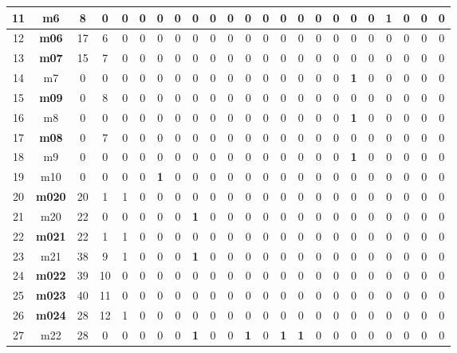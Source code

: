 \documentclass[a4paper,14pt]{extarticle}
\begin{document}
\begin{landscape}
\begin{table}[htbp]
\begin{tabular}{|c||c|c|c|c|c|c|c|c|c|c|c|c|c|c|c|c|c|c|c|c|c|c|}
		11 & m6 & 8 & 0 & 0 & 0 & 0 & 0 & 0 & 0 & 0 & 0 & 0 & 0 & 0 & 0 & 0 & 0 & 0 & \textbf{1} & 0 & 0 & 0 \\ \hline
		12 & \textbf{m06} & 17 & 6 & 0 & 0 & 0 & 0 & 0 & 0 & 0 & 0 & 0 & 0 & 0 & 0 & 0 & 0 & 0 & 0 & 0 & 0 & 0 \\ \hline
		13 & \textbf{m07} & 15 & 7 & 0 & 0 & 0 & 0 & 0 & 0 & 0 & 0 & 0 & 0 & 0 & 0 & 0 & 0 & 0 & 0 & 0 & 0 & 0 \\ \hline
		14 & m7 & 0 & 0 & 0 & 0 & 0 & 0 & 0 & 0 & 0 & 0 & 0 & 0 & 0 & 0 & 0 & \textbf{1} & 0 & 0 & 0 & 0 & 0 \\ \hline
		15 & \textbf{m09} & 0 & 8 & 0 & 0 & 0 & 0 & 0 & 0 & 0 & 0 & 0 & 0 & 0 & 0 & 0 & 0 & 0 & 0 & 0 & 0 & 0 \\ \hline
		16 & m8 & 0 & 0 & 0 & 0 & 0 & 0 & 0 & 0 & 0 & 0 & 0 & 0 & 0 & 0 & 0 & \textbf{1} & 0 & 0 & 0 & 0 & 0 \\ \hline
		17 & \textbf{m08} & 0 & 7 & 0 & 0 & 0 & 0 & 0 & 0 & 0 & 0 & 0 & 0 & 0 & 0 & 0 & 0 & 0 & 0 & 0 & 0 & 0 \\ \hline
		18 & m9 & 0 & 0 & 0 & 0 & 0 & 0 & 0 & 0 & 0 & 0 & 0 & 0 & 0 & 0 & 0 & \textbf{1} & 0 & 0 & 0 & 0 & 0 \\ \hline
		19 & m10 & 0 & 0 & 0 & 0 & \textbf{1} & 0 & 0 & 0 & 0 & 0 & 0 & 0 & 0 & 0 & 0 & 0 & 0 & 0 & 0 & 0 & 0 \\ \hline
		20 & \textbf{m020} & 20 & 1 & 1 & 0 & 0 & 0 & 0 & 0 & 0 & 0 & 0 & 0 & 0 & 0 & 0 & 0 & 0 & 0 & 0 & 0 & 0 \\ \hline
		21 & m20 & 22 & 0 & 0 & 0 & 0 & 0 & \textbf{1} & 0 & 0 & 0 & 0 & 0 & 0 & 0 & 0 & 0 & 0 & 0 & 0 & 0 & 0 \\ \hline
		22 & \textbf{m021} & 22 & 1 & 1 & 0 & 0 & 0 & 0 & 0 & 0 & 0 & 0 & 0 & 0 & 0 & 0 & 0 & 0 & 0 & 0 & 0 & 0 \\ \hline
		23 & m21 & 38 & 9 & 1 & 0 & 0 & 0 & \textbf{1} & 0 & 0 & 0 & 0 & 0 & 0 & 0 & 0 & 0 & 0 & 0 & 0 & 0 & 0 \\ \hline
		24 & \textbf{m022} & 39 & 10 & 0 & 0 & 0 & 0 & 0 & 0 & 0 & 0 & 0 & 0 & 0 & 0 & 0 & 0 & 0 & 0 & 0 & 0 & 0 \\ \hline
		25 & \textbf{m023} & 40 & 11 & 0 & 0 & 0 & 0 & 0 & 0 & 0 & 0 & 0 & 0 & 0 & 0 & 0 & 0 & 0 & 0 & 0 & 0 & 0 \\ \hline
		26 & \textbf{m024} & 28 & 12 & 1 & 0 & 0 & 0 & 0 & 0 & 0 & 0 & 0 & 0 & 0 & 0 & 0 & 0 & 0 & 0 & 0 & 0 & 0 \\ \hline
		27 & m22 & 28 & 0 & 0 & 0 & 0 & 0 & \textbf{1} & 0 & 0 & \textbf{1} & 0 & \textbf{1} & \textbf{1} & 0 & 0 & 0 & 0 & 0 & 0 & 0 & 0 \\ \hline

\end{tabular}
\end{table}
\end{landscape}
\end{document}
